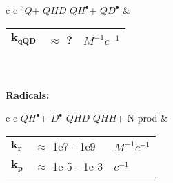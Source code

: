 \documentclass{article}
\def\QH{$QH^{\bullet }$}
\def\D{$D^{\bullet }$}
\def\Qt{$^{3}Q$}
\def\QHH{$QHH$}
\def\QHD{$QHD$}
\def\QD{$QD^{\bullet }$}
\begin{document}
\begin{tabular}{ c c }
    \schemestart
    \Qt + \QHD
    \arrow{->[$k_{qQD}$]}
    \QH + \QD
    \schemestop
     & \begin{tabular}{ l l l }
           $\mathbf{k_{qQD}}$ & $\approx$ ? & $M^{-1}c^{-1}$ \\\hline
       \end{tabular}
    \vspace{1.5mm}
\end{tabular}
\vspace{1.5mm}
\\
\\
\textbf{Radicals:}

\begin{tabular}{ c c }
    \schemestart
    \QH + \D
    \arrow{->[$k_{r}$]}
    \QHD
    \arrow{->[$k_{p}$]}
    \QHH + N-prod
    \schemestop
     & \begin{tabular}{ l l l }
           $\mathbf{k_{r}}$ & $\approx$ 1e7 - 1e9   & $M^{-1}c^{-1}$ \\
           $\mathbf{k_{p}}$ & $\approx$ 1e-5 - 1e-3 & $c^{-1}$       \\\hline
       \end{tabular}
    \vspace{1.5mm}
\end{tabular}
\vspace{1.5mm}
\end{document}
